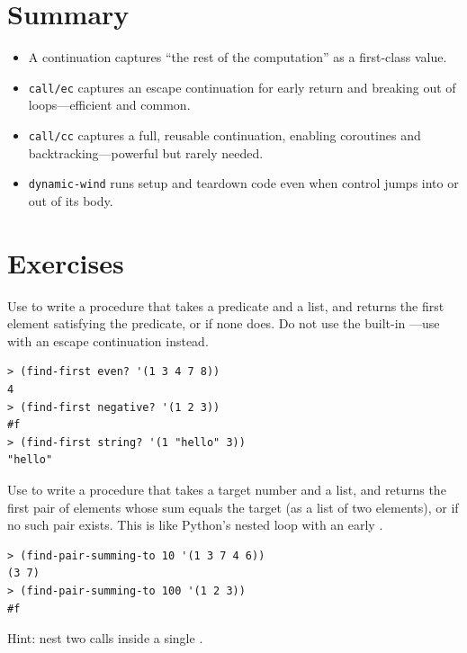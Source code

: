 \section*{Summary}

\begin{itemize}
    \item A continuation captures ``the rest of the computation'' as a first-class value.
    \item \texttt{call/ec} captures an escape continuation for early return and breaking out of loops---efficient and common.
    \item \texttt{call/cc} captures a full, reusable continuation, enabling coroutines and backtracking---powerful but rarely needed.
    \item \texttt{dynamic-wind} runs setup and teardown code even when control jumps into or out of its body.
\end{itemize}

\section*{Exercises}

\begin{exercise}
Use  to write a  procedure that takes a predicate and a list, and returns the first element satisfying the predicate, or  if none does. Do not use the built-in ---use  with an escape continuation instead.

\begin{lstlisting}[style=repl]
> (find-first even? '(1 3 4 7 8))
4
> (find-first negative? '(1 2 3))
#f
> (find-first string? '(1 "hello" 3))
"hello"
\end{lstlisting}
\end{exercise}

\begin{exercise}
Use  to write a  procedure that takes a target number and a list, and returns the first pair of elements whose sum equals the target (as a list of two elements), or  if no such pair exists. This is like Python's nested loop with an early .

\begin{lstlisting}[style=repl]
> (find-pair-summing-to 10 '(1 3 7 4 6))
(3 7)
> (find-pair-summing-to 100 '(1 2 3))
#f
\end{lstlisting}

Hint: nest two  calls inside a single .
\end{exercise}

